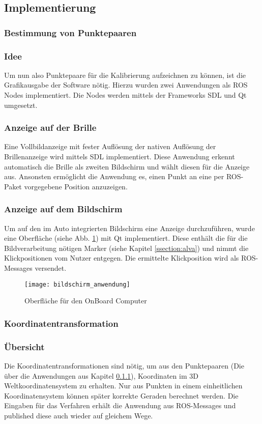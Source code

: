 \subsection{Implementierung}


\subsubsection{Bestimmung von Punktepaaren}
\label{chap:punktepaare}
\subsubsection*{Idee}
Um nun also Punktepaare für die Kalibrierung aufzeichnen zu können, ist die Grafikausgabe der Software nötig. Hierzu wurden zwei Anwendungen als ROS Nodes implementiert. Die Nodes werden mittels der Frameworks \ac{SDL}  \cite{sdl} und  Qt \cite{qt} umgesetzt.
\subsubsection*{Anzeige auf der Brille}
Eine Vollbildanzeige mit fester Auflösung der nativen Auflösung der Brillenanzeige wird mittels SDL implementiert. Diese Anwendung erkennt automatisch die Brille als zweiten Bildschirm und wählt diesen für die Anzeige aus. Ansonsten ermöglicht die Anwendung es, einen Punkt an eine per ROS-Paket vorgegebene Position anzuzeigen.

\subsubsection*{Anzeige auf dem Bildschirm}
Um auf den im Auto integrierten Bildschirm eine Anzeige durchzuführen, wurde eine Oberfläche (siehe Abb. \ref{fig:fensteranwendung}) mit Qt implementiert. Diese enthält die für die Bildverarbeitung nötigen Marker (siehe Kapitel \ref{ssection:alva}) und nimmt die Klickpositionen vom Nutzer entgegen. Die ermittelte Klickposition wird als ROS-Messages versendet.
\begin{figure}[h]
   \centering
   \texttt{[image: bildschirm\_anwendung]}
   \caption{Oberfläche für den OnBoard Computer}
   \label{fig:fensteranwendung}
\end{figure}


\subsubsection{Koordinatentransformation}
\subsubsection*{Übersicht}
Die Koordinatentransformationen sind nötig, um aus den Punktepaaren (Die über die Anwendungen aus Kapitel \ref{chap:punktepaare}), Koordinaten im 3D Weltkoordinatensystem zu erhalten. Nur aus Punkten in einem einheitlichen Koordinatensystem können später korrekte Geraden berechnet werden.
Die Eingaben für das Verfahren erhält die Anwendung aus ROS-Messages und published diese auch wieder auf gleichem Wege.

